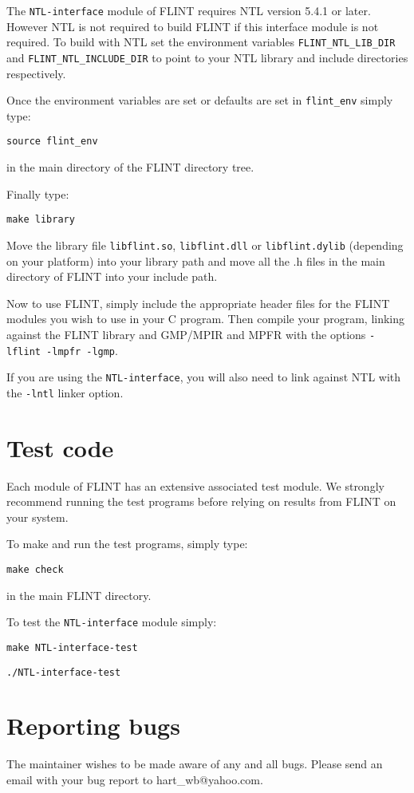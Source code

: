 \documentclass[a4paper,10pt]{article}
\newcommand{\code}{\lstinline}
\begin{document}
The \code{NTL-interface} module of FLINT requires NTL version 5.4.1 or later. However NTL is not required 
to build FLINT if this interface module is not required. To build with NTL set the environment variables 
\code{FLINT_NTL_LIB_DIR} and \code{FLINT_NTL_INCLUDE_DIR} to point to your NTL library and include 
directories respectively.

Once the environment variables are set or defaults are set in \code{flint_env} simply type:

\code{source flint_env}

in the main directory of the FLINT directory tree. 

Finally type:

\code{make library}

Move the library file \code{libflint.so}, \code{libflint.dll} or \code{libflint.dylib} (depending on 
your platform) into your library path and move all the .h files in the main directory of FLINT into 
your include path.

Now to use FLINT, simply include the appropriate header files for the FLINT modules you wish to use in 
your C program. Then compile your program, linking against the FLINT library and GMP/MPIR and MPFR with the 
options \code{-lflint -lmpfr -lgmp}.

If you are using the \code{NTL-interface}, you will also need to link against NTL with the \code{-lntl}
linker option.

\section{Test code}
Each module of FLINT has an extensive associated test module. We strongly recommend running the test 
programs before relying on results from FLINT on your system. 

To make and run the test programs, simply type:

\code{make check}

in the main FLINT directory.

To test the \code{NTL-interface} module simply:

\code{make NTL-interface-test}

\code{./NTL-interface-test}

\section{Reporting bugs}
The maintainer wishes to be made aware of any and all bugs. Please send an email with your bug report to 
hart\_wb@yahoo.com.
\end{document}
